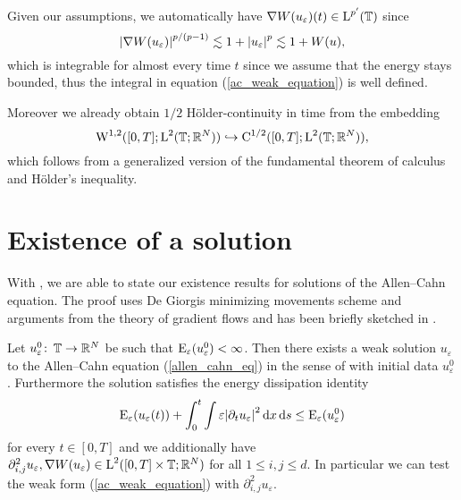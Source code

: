 \begin{remark}
	Given our assumptions, we automatically have $ \nabla W ( u_{ \varepsilon } ) ( t ) \in \operatorname{L}^{ p' } ( \operatorname{\mathbb{T}} ) $ since
	\begin{equation}
		\abs{ \nabla W ( u_{ \varepsilon} ) }^{ p/(p-1) }
		\lesssim
		1+ \abs{u_{ \varepsilon }}^{ p }
		\lesssim
		1 + W ( u ),
	\end{equation}
	which is integrable for almost every time $ t $ since we assume that the energy stays bounded,
	thus the integral in equation (\ref{ac_weak_equation}) is well defined.
	
	Moreover we already obtain $ 1/2 $ Hölder-continuity in time from the embedding
	\begin{equation}
		\operatorname{W}^{ 1 , 2} ( [ 0 , T ] ; \operatorname{L}^{ 2 } ( \operatorname{\mathbb{T}};\mathbb{ R }^{ N } ) )
		\hookrightarrow
		\operatorname{C}^{ 1/2 } ( [ 0 , T ] ; \operatorname{L}^{ 2 } ( \operatorname{\mathbb{T}} ; \mathbb{ R }^{ N } ) ),
	\end{equation}
	which follows from a generalized version of the fundamental theorem of calculus and Hölder's inequality.
\end{remark}

\section{Existence of a solution}

With , we are able to state our existence results for solutions of the Allen--Cahn equation. The proof uses De Giorgis minimizing movements scheme and arguments from the theory of gradient flows and has been briefly sketched in \cite{convergence_of_allen_cahn_equation_to_multiphase_mean_curvature_flow}.

\begin{theorem}
	\label{existence_of_ac_solution}
	Let $ u_{ \varepsilon}^{ 0 } \colon \operatorname{\mathbb{T}} \to \mathbb{ R }^{ N } $ be such that 
	$ \operatorname{E}_{ \varepsilon } ( u_{ \varepsilon}^{ 0 } ) < \infty $.
	Then there exists a weak solution $ u_{ \varepsilon} $ to the Allen--Cahn equation (\ref{allen_cahn_eq}) in the sense of  with initial data $ u_{ \varepsilon}^{ 0 } $.
	Furthermore the solution satisfies the energy dissipation identity
	\begin{equation}
		\label{energy_dissipation_sharp}
		\operatorname{E}_{ \varepsilon } ( u_{ \varepsilon } ( t ) )
		+
		\int_{ 0 }^{ t }
			\int
				\varepsilon \abs{ \partial_{ t } u_{ \varepsilon } }^{ 2 }
			\dd{ x }
		\dd{ s }
		\leq
		\operatorname{E}_{ \varepsilon } ( u_{ \varepsilon}^{ 0 } )
	\end{equation}
	for every $ t \in [ 0 , T ] $ and we additionally have
	$
		\partial_{ i , j }^{ 2 } u_{ \varepsilon }, \nabla W ( u_{ \varepsilon } ) \in \operatorname{L}^{ 2 } ( [0, T] \times \operatorname{\mathbb{T}} ; \mathbb{ R }^{ N } ) 
	$
	for all $ 1 \leq i, j \leq d $. In particular we can test the weak form (\ref{ac_weak_equation}) with $ \partial_{ i , j }^{ 2 } u_{ \varepsilon } $.
\end{theorem}

